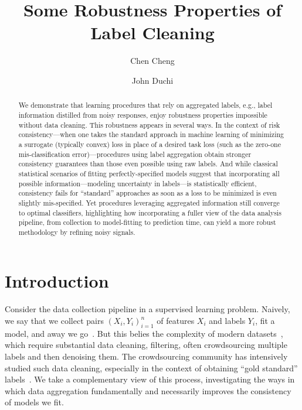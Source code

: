 \documentclass[11pt]{article}
\title{Some Robustness Properties of Label Cleaning}
\author{Chen Cheng \and John Duchi}
\begin{document}
\maketitle

\begin{abstract}
  We demonstrate that learning procedures that rely on aggregated labels, e.g.,
  label information distilled from noisy responses, enjoy robustness properties
  impossible without data cleaning.
  This robustness appears in several ways.
  In the context of risk consistency---when one takes the standard approach
  in machine learning of minimizing a surrogate (typically convex) loss in
  place of a desired task loss (such as the zero-one mis-classification
  error)---procedures using label aggregation obtain stronger consistency
  guarantees than those even possible using raw labels.
  And while classical statistical scenarios of fitting perfectly-specified
  models suggest that incorporating all possible information---modeling
  uncertainty in labels---is statistically efficient, consistency fails for
  ``standard'' approaches as soon as a loss to be minimized is even slightly
  mis-specified.
  Yet procedures leveraging aggregated information still converge to optimal
  classifiers, highlighting how incorporating a fuller view of the data
  analysis pipeline, from collection to model-fitting to prediction time,
  can yield a more robust methodology by refining noisy signals.
\end{abstract}


\section{Introduction}

Consider the data collection pipeline in a supervised learning problem.
%
Naively, we say that we collect pairs $(X_i, Y_i)_{i = 1}^n$ of features
$X_i$ and labels $Y_i$, fit a model, and away we go~\citep{HastieTiFr09}.
%
But this belies the complexity of modern datasets~\citep{DengDoSoLiLiFe09,
  KrizhevskyHi09, RussakovskyDeSuKrSaMaHuKaKhBeBeFe15}, which require
substantial data cleaning, filtering, often crowdsourcing multiple labels
and then denoising them.
%
The crowdsourcing community has intensively studied such data cleaning,
especially in the context of obtaining ``gold standard''
labels~\citep{DawidSk79, WhitehillWuBeMoRu09, WelinderBrPeBe10, Vaughan18,
  PlataniosAlXiMi20}.
%
We take a complementary view of this process, investigating the
ways in which data aggregation fundamentally and necessarily
improves the consistency of models we fit.
\end{document}
